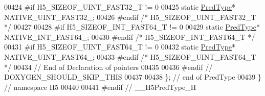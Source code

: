 \begin{DoxyCode}
00424 \textcolor{preprocessor}{#if H5\_SIZEOF\_UINT\_FAST32\_T != 0}
00425         \textcolor{keyword}{static} \hyperlink{class_h5_1_1_pred_type}{PredType}* NATIVE\_UINT\_FAST32\_;
00426 \textcolor{preprocessor}{#endif }\textcolor{comment}{/* H5\_SIZEOF\_UINT\_FAST32\_T */}\textcolor{preprocessor}{}
00427 
00428 \textcolor{preprocessor}{#if H5\_SIZEOF\_INT\_FAST64\_T != 0}
00429         \textcolor{keyword}{static} \hyperlink{class_h5_1_1_pred_type}{PredType}* NATIVE\_INT\_FAST64\_;
00430 \textcolor{preprocessor}{#endif }\textcolor{comment}{/* H5\_SIZEOF\_INT\_FAST64\_T */}\textcolor{preprocessor}{}
00431 \textcolor{preprocessor}{#if H5\_SIZEOF\_UINT\_FAST64\_T != 0}
00432         \textcolor{keyword}{static} \hyperlink{class_h5_1_1_pred_type}{PredType}* NATIVE\_UINT\_FAST64\_;
00433 \textcolor{preprocessor}{#endif }\textcolor{comment}{/* H5\_SIZEOF\_UINT\_FAST64\_T */}\textcolor{preprocessor}{}
00434         \textcolor{comment}{// End of Declaration of pointers}
00435 
00436 \textcolor{preprocessor}{#endif // DOXYGEN\_SHOULD\_SKIP\_THIS}
00437 
00438 \}; \textcolor{comment}{// end of PredType}
00439 \} \textcolor{comment}{// namespace H5}
00440 
00441 \textcolor{preprocessor}{#endif // \_\_H5PredType\_H}
\end{DoxyCode}
